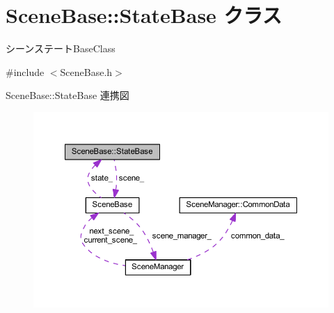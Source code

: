 \hypertarget{class_scene_base_1_1_state_base}{}\section{Scene\+Base\+:\+:State\+Base クラス}
\label{class_scene_base_1_1_state_base}


シーンステート\+Base\+Class  




{\ttfamily \#include $<$Scene\+Base.\+h$>$}



Scene\+Base\+:\+:State\+Base 連携図\nopagebreak
\begin{figure}[H]
\begin{center}
\leavevmode
\includegraphics[width=350pt]{class_scene_base_1_1_state_base__coll__graph}
\end{center}
\end{figure}
